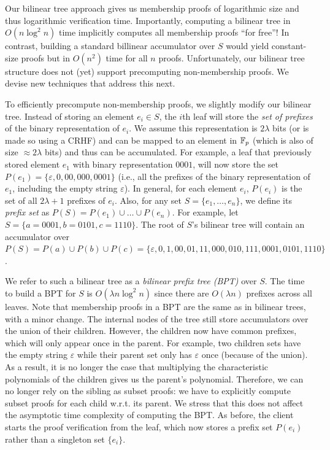 Our bilinear tree approach gives us membership proofs of logarithmic size and thus logarithmic verification time.
Importantly, computing a bilinear tree in $O(n\log^2{n})$ time implicitly computes all membership proofs ``for free''!
In contrast, building a standard billinear accumulator over $S$ would yield constant-size proofs but in $O(n^2)$ time for all $n$ proofs.
Unfortunately, our bilinear tree structure does not (yet) support precomputing non-membership proofs.
We devise new techniques that address this next.

To efficiently precompute non-membership proofs, we slightly modify our bilinear tree.
Instead of storing an element $e_i \in S$, the $i$th leaf will store the \emph{set of prefixes} of the binary representation of $e_i$.
We assume this representation is $2\lambda$ bits (or is made so using a CRHF) and can be mapped to an element in $\mathbb{F}_p$ (which is also of size $\approx 2\lambda$ bits) and thus can be accumulated.
For example, a leaf that previously stored element $e_1$ with binary representation $0001$, will now store the set $P(e_1) = \{\varepsilon,0,00,000,0001\}$ (i.e., all the prefixes of the binary representation of $e_1$, including the empty string $\varepsilon$).
In general, for each element $e_i$, $P(e_i)$ is the set of all $2\lambda+1$ prefixes of $e_i$.
Also, for any set $S = \{e_1,\dots,e_n\}$, we define its \emph{prefix set} as $P(S) = P(e_1) \cup \dots \cup P(e_n)$.
For example, let $S =\{a=0001,b=0101,c=1110\}$.
The root of $S$'s bilinear tree will contain an accumulator over $P(S) = P(a) \cup P(b) \cup P(c) = \{\varepsilon,0,1,00,01,11,000,010,111,0001,0101,1110\}$.

We refer to such a bilinear tree as a \emph{bilinear prefix tree (BPT)} over $S$.
The time to build a BPT for $S$ is $O(\lambda n\log^2{n})$ since there are $O(\lambda n)$ prefixes across all leaves.
Note that membership proofs in a BPT are the same as in bilinear trees, with a minor change.
The internal nodes of the tree still store accumulators over the union of their children.
However, the children now have common prefixes, which will only appear once in the parent.
For example, two children sets have the empty string $\varepsilon$ while their parent set only has $\varepsilon$ once (because of the union).
As a result, it is no longer the case that multiplying the characteristic polynomials of the children gives us the parent's polynomial.
Therefore, we can no longer rely on the sibling as subset proofs: we have to explicitly compute subset proofs for each child w.r.t. its parent.
We stress that this does not affect the asymptotic time complexity of computing the BPT.
As before, the client starts the proof verification from the leaf, which now stores a prefix set $P(e_i)$ rather than a singleton set $\{e_i\}$.

